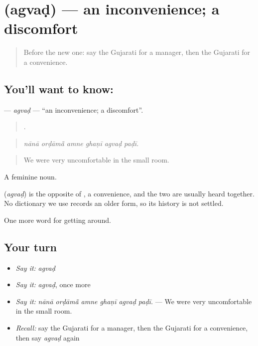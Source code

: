 \section[\texorpdfstring{\gu{અગવડ} (agvaḍ)}{અગવડ (agvaḍ)}]{ (agvaḍ) — an inconvenience; a discomfort}

\label{lesson:GU-C409-agvad}



\begin{quote}
Before the new one: say the Gujarati for a manager, then the Gujarati for a convenience.
\end{quote}

\subsection*{You'll want to know: }
\textbf{} — \emph{agvaḍ} — \textquotedblleft{}an inconvenience; a discomfort\textquotedblright{}.

\begin{quote}
     .
\end{quote}

\begin{quote}
\emph{nānā orḍāmā̃ amne ghaṇī agvaḍ paḍī.}
\end{quote}

\begin{quote}
We were very uncomfortable in the small room.
\end{quote}

A feminine noun.

\begin{cousinweb}
\textbf{} (\emph{agvaḍ}) is the opposite of , a convenience, and the two are usually heard together. No dictionary we use records an older form, so its history is not settled.
\end{cousinweb}

\begin{grammarlens}[title={What you've built}]
One more word for getting around.
\end{grammarlens}

\subsection*{Your turn}
\begin{itemize}
\raggedright
  \item \emph{Say it:} \emph{agvaḍ}
  \item \emph{Say it:} \emph{agvaḍ}, once more
  \item \emph{Say it:} \emph{nānā orḍāmā̃ amne ghaṇī agvaḍ paḍī.} — We were very uncomfortable in the small room.
  \item \emph{Recall:} say the Gujarati for a manager, then the Gujarati for a convenience, then say \emph{agvaḍ} again
\end{itemize}


